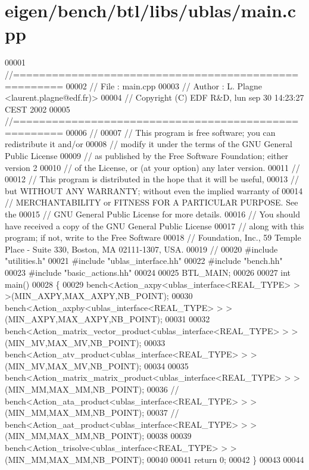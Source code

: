 \hypertarget{eigen_2bench_2btl_2libs_2ublas_2main_8cpp_source}{}\section{eigen/bench/btl/libs/ublas/main.cpp}
\label{eigen_2bench_2btl_2libs_2ublas_2main_8cpp_source}

\begin{DoxyCode}
00001 \textcolor{comment}{//=====================================================}
00002 \textcolor{comment}{// File   :  main.cpp}
00003 \textcolor{comment}{// Author :  L. Plagne <laurent.plagne@edf.fr)>}
00004 \textcolor{comment}{// Copyright (C) EDF R&D,  lun sep 30 14:23:27 CEST 2002}
00005 \textcolor{comment}{//=====================================================}
00006 \textcolor{comment}{//}
00007 \textcolor{comment}{// This program is free software; you can redistribute it and/or}
00008 \textcolor{comment}{// modify it under the terms of the GNU General Public License}
00009 \textcolor{comment}{// as published by the Free Software Foundation; either version 2}
00010 \textcolor{comment}{// of the License, or (at your option) any later version.}
00011 \textcolor{comment}{//}
00012 \textcolor{comment}{// This program is distributed in the hope that it will be useful,}
00013 \textcolor{comment}{// but WITHOUT ANY WARRANTY; without even the implied warranty of}
00014 \textcolor{comment}{// MERCHANTABILITY or FITNESS FOR A PARTICULAR PURPOSE.  See the}
00015 \textcolor{comment}{// GNU General Public License for more details.}
00016 \textcolor{comment}{// You should have received a copy of the GNU General Public License}
00017 \textcolor{comment}{// along with this program; if not, write to the Free Software}
00018 \textcolor{comment}{// Foundation, Inc., 59 Temple Place - Suite 330, Boston, MA  02111-1307, USA.}
00019 \textcolor{comment}{//}
00020 \textcolor{preprocessor}{#include "utilities.h"}
00021 \textcolor{preprocessor}{#include "ublas\_interface.hh"}
00022 \textcolor{preprocessor}{#include "bench.hh"}
00023 \textcolor{preprocessor}{#include "basic\_actions.hh"}
00024 
00025 BTL\_MAIN;
00026 
00027 \textcolor{keywordtype}{int} main()
00028 \{
00029   bench<Action\_axpy<ublas\_interface<REAL\_TYPE> > >(MIN\_AXPY,MAX\_AXPY,NB\_POINT);
00030   bench<Action\_axpby<ublas\_interface<REAL\_TYPE> > >(MIN\_AXPY,MAX\_AXPY,NB\_POINT);
00031 
00032   bench<Action\_matrix\_vector\_product<ublas\_interface<REAL\_TYPE> > >(MIN\_MV,MAX\_MV,NB\_POINT);
00033   bench<Action\_atv\_product<ublas\_interface<REAL\_TYPE> > >(MIN\_MV,MAX\_MV,NB\_POINT);
00034 
00035   bench<Action\_matrix\_matrix\_product<ublas\_interface<REAL\_TYPE> > >(MIN\_MM,MAX\_MM,NB\_POINT);
00036 \textcolor{comment}{//   bench<Action\_ata\_product<ublas\_interface<REAL\_TYPE> > >(MIN\_MM,MAX\_MM,NB\_POINT);}
00037 \textcolor{comment}{//   bench<Action\_aat\_product<ublas\_interface<REAL\_TYPE> > >(MIN\_MM,MAX\_MM,NB\_POINT);}
00038 
00039   bench<Action\_trisolve<ublas\_interface<REAL\_TYPE> > >(MIN\_MM,MAX\_MM,NB\_POINT);
00040 
00041   \textcolor{keywordflow}{return} 0;
00042 \}
00043 
00044 
\end{DoxyCode}
